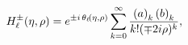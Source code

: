 \[\mathop{{H^{\pm}_{\ell}}\/}\nolimits\!\left(\eta,\rho\right)=e^{\pm i\mathop{{%
\theta_{\ell}}\/}\nolimits\!\left(\eta,\rho\right)}\sum_{k=0}^{\infty}\frac{%
\left(a\right)_{k}\left(b\right)_{k}}{k!(\mp 2i\rho)^{k}},\]